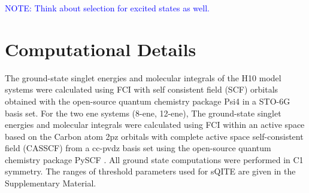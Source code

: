 \documentclass[aip,jcp,amsmath,amssymb, reprint]{revtex4-1}
\begin{document}

\textcolor{blue}{NOTE: Think about selection for excited states as well.}


\section{Computational Details}
The ground-state singlet energies and molecular integrals of the H10 model systems were calculated using FCI with self consistent field (SCF) orbitals obtained with the open-source quantum chemistry package Psi4 \cite{Parrish2017Psi4, smith2020psi4} in a STO-6G basis set. For the two ene systems (8-ene, 12-ene), The ground-state singlet energies and molecular integrals were calculated using FCI within an active space based on the Carbon atom 2pz orbitals with complete active space self-consistent field (CASSCF) from a cc-pvdz basis set using the open-source quantum chemistry package PySCF \cite{sun2018pyscf}. All ground state computations were performed in C1 symmetry. The ranges of threshold parameters used for sQITE are given in the Supplementary Material.
\end{document}
